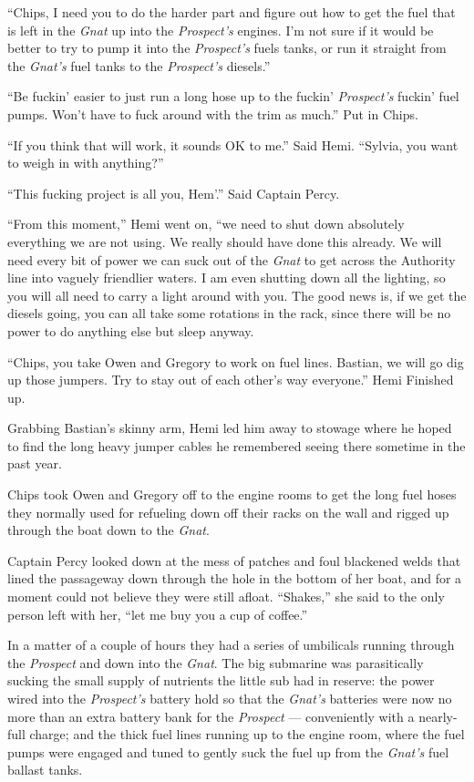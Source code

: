 \documentclass[
]{scrbook}
\begin{document}
``Chips, I need you to do the harder part and figure out how to get the
fuel that is left in the \emph{Gnat} up into the \emph{Prospect's}
engines. I'm not sure if it would be better to try to pump it into the
\emph{Prospect's} fuels tanks, or run it straight from the \emph{Gnat's}
fuel tanks to the \emph{Prospect's} diesels.''

``Be fuckin' easier to just run a long hose up to the fuckin'
\emph{Prospect's} fuckin' fuel pumps. Won't have to fuck around with the
trim as much.'' Put in Chips.

``If you think that will work, it sounds OK to me.'' Said Hemi.
``Sylvia, you want to weigh in with anything?''

``This fucking project is all you, Hem'.'' Said Captain Percy.

``From this moment,'' Hemi went on, ``we need to shut down absolutely
everything we are not using. We really should have done this already. We
will need every bit of power we can suck out of the \emph{Gnat} to get
across the Authority line into vaguely friendlier waters. I am even
shutting down all the lighting, so you will all need to carry a light
around with you. The good news is, if we get the diesels going, you can
all take some rotations in the rack, since there will be no power to do
anything else but sleep anyway.

``Chips, you take Owen and Gregory to work on fuel lines. Bastian, we
will go dig up those jumpers. Try to stay out of each other's way
everyone.'' Hemi Finished up.

Grabbing Bastian's skinny arm, Hemi led him away to stowage where he
hoped to find the long heavy jumper cables he remembered seeing there
sometime in the past year.

Chips took Owen and Gregory off to the engine rooms to get the long fuel
hoses they normally used for refueling down off their racks on the wall
and rigged up through the boat down to the \emph{Gnat}.

Captain Percy looked down at the mess of patches and foul blackened
welds that lined the passageway down through the hole in the bottom of
her boat, and for a moment could not believe they were still afloat.
``Shakes,'' she said to the only person left with her, ``let me buy you
a cup of coffee.''

In a matter of a couple of hours they had a series of umbilicals running
through the \emph{Prospect} and down into the \emph{Gnat}. The big
submarine was parasitically sucking the small supply of nutrients the
little sub had in reserve: the power wired into the \emph{Prospect's}
battery hold so that the \emph{Gnat's} batteries were now no more than
an extra battery bank for the \emph{Prospect} --- conveniently with a
nearly-full charge; and the thick fuel lines running up to the engine
room, where the fuel pumps were engaged and tuned to gently suck the
fuel up from the \emph{Gnat's} fuel ballast tanks.
\end{document}
